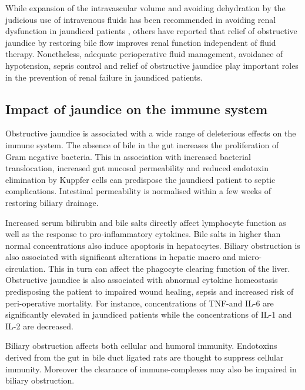 While expansion of the intravascular volume and avoiding dehydration by the judicious use of intravenous fluids has been recommended in avoiding renal dysfunction in jaundiced patients \parencite{parks_prospective_1994}, others have reported that relief of obstructive jaundice by restoring bile flow improves renal function independent of fluid therapy.\parencite{padillo_randomized_2005} Nonetheless, adequate perioperative fluid management, avoidance of hypotension, sepsis control and relief of obstructive jaundice play important roles in the prevention of renal failure in jaundiced patients.

\subsection{Impact of jaundice on the immune system}

Obstructive jaundice is associated with a wide range of deleterious effects on the immune system. The absence of bile in the gut increases the proliferation of Gram negative bacteria. This in association with increased bacterial translocation, increased gut mucosal permeability and reduced endotoxin elimination by Kuppfer cells can predispose the jaundiced patient to septic complications. Intestinal permeability is normalised within a few weeks of restoring biliary drainage.

Increased serum bilirubin and bile salts directly affect lymphocyte function as well as the response to pro-inflammatory cytokines. Bile salts in higher than normal concentrations also induce apoptosis in hepatocytes. Biliary obstruction is also associated with significant alterations in hepatic macro and micro-circulation. This in turn can affect the phagocyte clearing function of the liver. Obstructive jaundice is also associated with abnormal cytokine homeostasis predisposing the patient to impaired wound healing, sepsis and increased risk of peri-operative mortality.  For instance, concentrations of TNF-\alpha and IL-6 are significantly elevated in jaundiced patients while the concentrations of IL-1 and IL-2 are decreased.

Biliary obstruction affects both cellular and humoral immunity. Endotoxins derived from the gut in bile duct ligated rats are thought to suppress cellular immunity. Moreover the clearance of immune-complexes may also be impaired in biliary obstruction.



